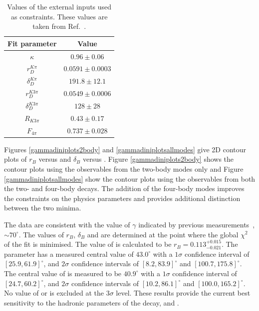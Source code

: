 \begin{table}
\centering
\begin{tabular}{cc}
Fit parameter & Value \\
\hline
$\kappa$ & $0.96 \pm 0.06$ \\
$r_D^{K\pi}$ & $0.0591 \pm 0.0003$ \\
$\delta_D^{K\pi}$ & $191.8 \pm 12.1$ \\
$r_D^{K3\pi}$ & $0.0549 \pm 0.0006$ \\
$\delta_D^{K3\pi}$ & $128 \pm 28$ \\
$R_{K3\pi}$ & $0.43 \pm 0.17$ \\
$F_{4\pi}$ & $0.737 \pm 0.028$
\end{tabular}
\caption{Values of the external inputs used as constraints. These values are taken from Ref.~\cite{HFAG,charmk3pi,charmk3pi_errata,LHCb-PAPER-2015-057,charm4pi}.}
\label{inputparameters}
\end{table}

Figures \ref{gammadiniplots2body} and \ref{gammadiniplotsallmodes} give 2D contour plots of $r_B$ versus \Pgamma and $\delta_B$ versus \Pgamma. Figure \ref{gammadiniplots2body} shows the contour plots using the \CP observables from the two-body modes only and Figure \ref{gammadiniplotsallmodes} show the contour plots using the \CP observables from both the two- and four-body decays. The addition of the four-body modes improves the constraints on the physics parameters and provides additional distinction between the two minima. 

The data are consistent with the value of $\gamma$ indicated by previous measurements~\cite{LHCb-PAPER-2016-032, CKMFitter}, $\sim 70^\circ$. The values of $r_B$, $\delta_B$ and \Pgamma are determined at the point where the global $\chi^2$ of the fit is minimised. The value of \rb is calculated to be $r_B = 0.113^{+0.015}_{-0.021}$. The parameter \deltab has a measured central value of $43.0^{\circ}$ with a $1\sigma$ confidence interval of $[25.9, 61.9]^{\circ}$, and $2\sigma$ confidence intervals of $[8.2, 83.9]^{\circ}$ and $[100.7,175.8]^{\circ}$. The central value of \Pgamma is measured to be $40.9^{\circ}$ with a $1\sigma$ confidence interval of $[24.7, 60.2]^{\circ}$, and $2\sigma$ confidence intervals of $[10.2, 86.1]^{\circ}$ and $[100.0,165.2]^{\circ}$. No value of \Pgamma or \deltab is excluded at the $3\sigma$ level. These results provide the current best sensitivity to the hadronic parameters of the \Bm decay, \rb and \deltab.

